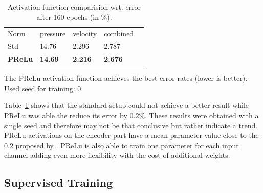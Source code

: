\documentclass[acmtog]{techreportacmart}
\begin{document}
\begin{table}[h]
\caption{Activation function comparision wrt. error after 160 epochs (in \%).}
\label{tab:three}
\begin{center}
\begin{tabular}{l|l|l|l|l}
  \toprule
  Norm   & pressure   &	velocity    & combined \\
  Std	 & 14.76	  & 2.296		&  2.787   \\
  \bf PReLu	 & \bf 14.69	  & \bf 2.216		& \bf 2.676	   \\
  \bottomrule
\end{tabular}
\end{center}
\bigskip\centering
\footnotesize The PReLu activation function achieves  
the best error rates (lower is better). \\
Used seed for training: $0$
\end{table}%

Table~\ref{tab:three} shows that the standard setup could not achieve a better result while PReLu was able the reduce its error by $0.2\%$. These results were obtained with a single seed and therefore may not be that conclusive but rather indicate a trend. PReLu activations on the encoder part have a mean parameter value close to the $0.2$ proposed by \cite{Thuerey20}. PReLu is also able to train one parameter for each input channel adding even more flexibility with the cost of additional weights.

\subsection{Supervised Training}
\end{document}
